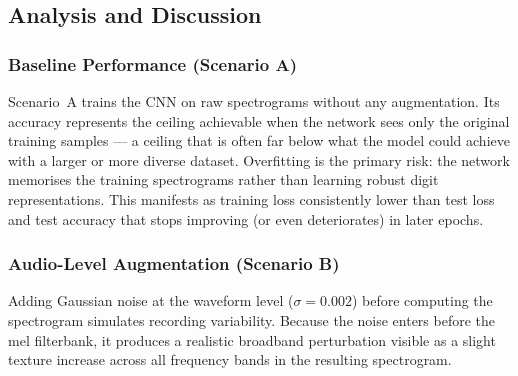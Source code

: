 \documentclass[12pt, a4paper]{article}
\begin{document}
%     

\subsection{Analysis and Discussion}

\subsubsection{Baseline Performance (Scenario A)}

Scenario~A trains the CNN on raw spectrograms without any augmentation. Its accuracy
represents the ceiling achievable when the network sees only the original training
samples --- a ceiling that is often far below what the model could achieve with a larger
or more diverse dataset. Overfitting is the primary risk: the network memorises the
training spectrograms rather than learning robust digit representations. This manifests
as training loss consistently lower than test loss and test accuracy that stops improving
(or even deteriorates) in later epochs.

\subsubsection{Audio-Level Augmentation (Scenario B)}

Adding Gaussian noise at the waveform level ($\sigma = 0.002$) before computing the
spectrogram simulates recording variability. Because the noise enters before the mel
filterbank, it produces a realistic broadband perturbation visible as a slight texture
increase across all frequency bands in the resulting spectrogram.
\end{document}

